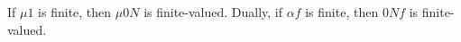 If $\mu 1$ is finite, then $\mu 0 N$ is finite-valued. Dually, if $\alpha f$ is finite, then $0 N f$ is finite-valued.
